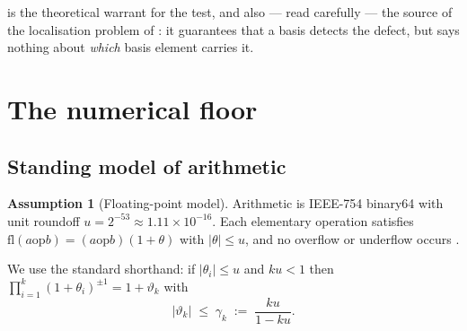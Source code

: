 \documentclass[11pt,twocolumn,a4paper]{article}
\theoremstyle{pstyle}
\theoremstyle{definition}
\newtheorem{assumption}[theorem]{Assumption}
\theoremstyle{remark}
\newcommand{\abs}[1]{\lvert#1\rvert}
\newcommand{\mach}{u}
\begin{document}
 is the theoretical warrant for the test, and
also --- read carefully --- the source of the localisation problem of
: it guarantees that a basis detects the defect, but
says nothing about \emph{which} basis element carries it.

\section{The numerical floor}
\label{sec:numerical-floor}

\subsection{Standing model of arithmetic}

\begin{assumption}[Floating-point model]
\label{ass:fp}
Arithmetic is IEEE-754 binary64 \citep{ieee754} with unit roundoff
$\mach = 2^{-53} \approx 1.11\times10^{-16}$. Each elementary operation
satisfies $\mathrm{fl}(a \mathbin{\mathrm{op}} b) =
(a\mathbin{\mathrm{op}}b)(1+\theta)$ with $\abs{\theta}\le\mach$, and no
overflow or underflow occurs \citep{higham2002,goldberg1991}.
\end{assumption}

We use the standard shorthand: if $\abs{\theta_i}\le\mach$ and
$k\mach<1$ then $\prod_{i=1}^{k}(1+\theta_i)^{\pm1} = 1+\vartheta_k$
with
\begin{equation}
  \abs{\vartheta_k} \;\le\; \gamma_k \;:=\; \frac{k\mach}{1-k\mach}.
  \label{eq:gamma}
\end{equation}
\end{document}
